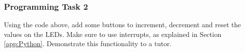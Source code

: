 \subsubsection{Programming Task 2}
Using the code above, add some buttons to increment, decrement and reset the values on the LEDs. Make sure to use interrupts, as explained in Section \ref{app:Python}. Demonstrate this functionality to a tutor.


